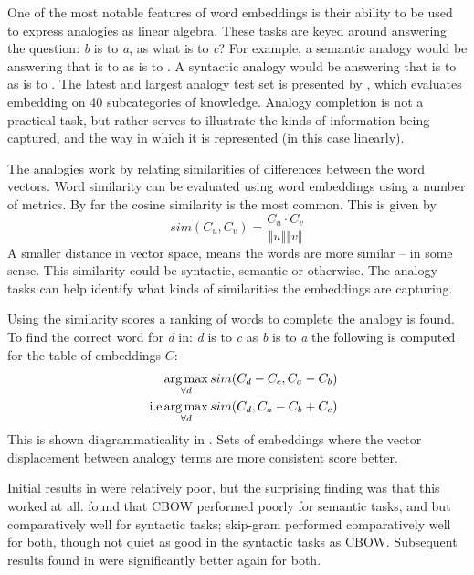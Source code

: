 \documentclass[parskip]{komatufte}
\begin{document}
One of the most notable features of  word embeddings is their ability to be used to express analogies as linear algebra.
These tasks are keyed around answering the question: \emph{b} is to \emph{a}, as what is  to \emph{c}?
For example, a semantic analogy would be answering that  is to  as  is to .
A syntactic analogy would be answering that  is to  as  is to .
The latest and largest analogy test set is presented by ,
which evaluates embedding on 40 subcategories of knowledge.
Analogy completion is not a practical task, but rather serves to illustrate the kinds of information being captured, and the way in which it is represented (in this case linearly).


The analogies work by relating similarities of differences between the word vectors.
Word similarity can be evaluated using word embeddings using a number of metrics.
By far the cosine similarity is the most common.
This is given by 
\begin{equation}
sim(C_u, C_v)=\frac{C_{u}\cdot C_{v}}{\left\Vert u\right\Vert \left\Vert v\right\Vert }
\end{equation}
A smaller distance in vector space, means the words are more similar -- in some sense.
This similarity could be syntactic, semantic or otherwise.
The analogy tasks can help identify what kinds of similarities the embeddings are capturing.

Using the similarity scores a ranking of words to complete the analogy is found.
To find the correct word for \emph{d} in: \emph{d} is to \emph{c} as \emph{b} is to \emph{a}
the following is computed for the table of embeddings $C$:
\begin{align}
\qquad & \operatorname*{arg\,max}_{\forall d} sim(C_d - C_c, C_a-C_b)\\
\text{i.e} & \operatorname*{arg\,max}_{\forall d} sim(C_d, C_a-C_b+C_c)
\end{align}
This is shown diagrammaticality in .
Sets of embeddings where the vector displacement between analogy terms are more consistent score better.


Initial results in \textcite{mikolov2013linguisticsubstructures} were relatively poor, but the surprising finding was that this worked at all.
\textcite{mikolov2013efficient} found that CBOW performed poorly for semantic tasks, and but comparatively well for syntactic tasks; skip-gram performed comparatively well for both, though not quiet as good in the syntactic tasks as CBOW.
Subsequent results found in   were significantly better again for both.
\end{document}
